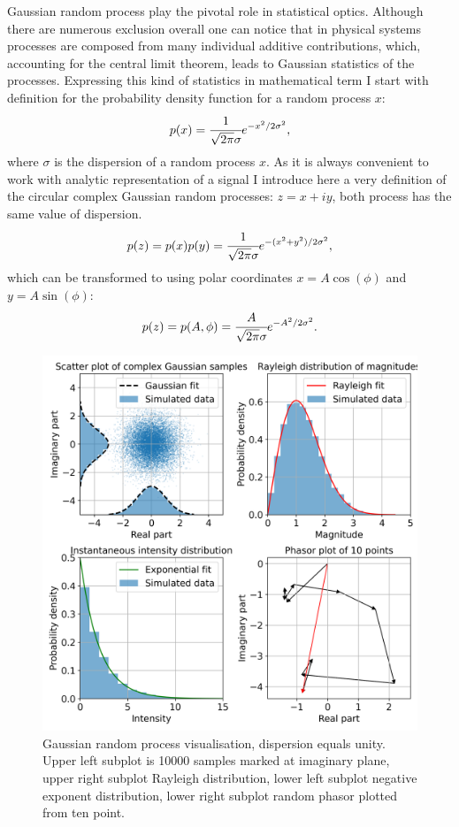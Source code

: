     Gaussian random process play the pivotal role in statistical optics. Although there are numerous exclusion overall one can notice that in physical systems processes are composed from many individual additive contributions, which, accounting for the central limit theorem, leads to Gaussian statistics of the processes. Expressing this kind of statistics in mathematical term I start with definition for the probability density function for a random process $x$:
    \begin{align}
        p(x) = \cfrac{1}{\sqrt{2 \pi}\sigma} e^{-x^2/2\sigma^2},
    \end{align}
    where $\sigma$ is the dispersion of a random process $x$.
    As it is always convenient to work with analytic representation of a signal I introduce here a very definition of the circular complex Gaussian random processes: $z = x + iy$, both process has the same value of dispersion.
    \begin{align}
        p(z) = p(x)p(y) = \cfrac{1}{\sqrt{2 \pi}\sigma} e^{-(x^2 + y^2)/2\sigma^2},
    \end{align}
    which can be transformed to using polar coordinates $x = A\cos(\phi)$ and $y = A\sin(\phi)$:
    \begin{align}
        p(z) = p(A, \phi) = \cfrac{A}{\sqrt{2 \pi}\sigma} e^{-A^2/2\sigma^2}.
    \end{align}
    \begin{figure}[h!]
    	\centering
        \includegraphics[width=0.75\linewidth]{content/images/Statistical_Optics/gaussian_process.png}
        \captionsetup{justification=centering}
        \caption{Gaussian random process visualisation, dispersion equals unity. Upper left subplot is 10000 samples marked at imaginary plane, upper right subplot Rayleigh distribution, lower left subplot negative exponent distribution, lower right subplot random phasor plotted from ten point.}
        \label{Fig:gaussian_process}
    \end{figure}
